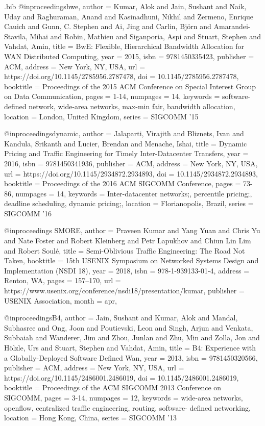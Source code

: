 \documentclass[sigconf]{acmart}
\begin{document}
\begin{filecontents}{\jobname.bib}
@inproceedings{bwe, author = {Kumar, Alok and Jain, Sushant and Naik, Uday and Raghuraman, Anand and Kasinadhuni, Nikhil and Zermeno, Enrique Cauich and Gunn, C. Stephen and Ai, Jing and Carlin, Bj\"{o}rn and Amarandei-Stavila, Mihai and Robin, Mathieu and Siganporia, Aspi and Stuart, Stephen and Vahdat, Amin}, title = {BwE: Flexible, Hierarchical Bandwidth Allocation for WAN Distributed Computing}, year = {2015}, isbn = {9781450335423}, publisher = {ACM}, address = {New York, NY, USA}, url = {https://doi.org/10.1145/2785956.2787478}, doi = {10.1145/2785956.2787478}, booktitle = {Proceedings of the 2015 ACM Conference on Special Interest Group on Data Communication}, pages = {1-14}, numpages = {14}, keywords = {software-defined network, wide-area networks, max-min fair, bandwidth allocation}, location = {London, United Kingdom}, series = {SIGCOMM '15} }

@inproceedings{dynamic, author = {Jalaparti, Virajith and Bliznets, Ivan and Kandula, Srikanth and Lucier, Brendan and Menache, Ishai}, title = {Dynamic Pricing and Traffic Engineering for Timely Inter-Datacenter Transfers}, year = {2016}, isbn = {9781450341936}, publisher = {ACM}, address = {New York, NY, USA}, url = {https://doi.org/10.1145/2934872.2934893}, doi = {10.1145/2934872.2934893}, booktitle = {Proceedings of the 2016 ACM SIGCOMM Conference}, pages = {73-86}, numpages = {14}, keywords = {Inter-datacenter networks;, percentile pricing;, deadline scheduling, dynamic pricing;}, location = {Florianopolis, Brazil}, series = {SIGCOMM '16} }

@inproceedings {SMORE,
author = {Praveen Kumar and Yang Yuan and Chris Yu and Nate Foster and Robert Kleinberg and Petr Lapukhov and Chiun Lin Lim and Robert Soul{\'e}},
title = {Semi-Oblivious Traffic Engineering: The Road Not Taken},
booktitle = {15th {USENIX} Symposium on Networked Systems Design and Implementation ({NSDI} 18)},
year = {2018},
isbn = {978-1-939133-01-4},
address = {Renton, WA},
pages = {157--170},
url = {https://www.usenix.org/conference/nsdi18/presentation/kumar},
publisher = {{USENIX} Association},
month = apr,
}


@inproceedings{B4, author = {Jain, Sushant and Kumar, Alok and Mandal, Subhasree and Ong, Joon and Poutievski, Leon and Singh, Arjun and Venkata, Subbaiah and Wanderer, Jim and Zhou, Junlan and Zhu, Min and Zolla, Jon and H\"{o}lzle, Urs and Stuart, Stephen and Vahdat, Amin}, title = {B4: Experience with a Globally-Deployed Software Defined Wan}, year = {2013}, isbn = {9781450320566}, publisher = {ACM}, address = {New York, NY, USA}, url = {https://doi.org/10.1145/2486001.2486019}, doi = {10.1145/2486001.2486019}, booktitle = {Proceedings of the ACM SIGCOMM 2013 Conference on SIGCOMM}, pages = {3-14}, numpages = {12}, keywords = {wide-area networks, openflow, centralized traffic engineering, routing, software- defined networking}, location = {Hong Kong, China}, series = {SIGCOMM '13} }
 

\end{filecontents}
\end{document}
